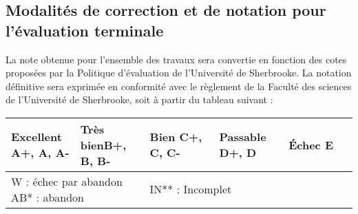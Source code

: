 \documentclass[12]{article}
\begin{document}
	\subsection*{Modalités de correction et de notation pour l'évaluation terminale}

	La note obtenue pour l’ensemble des travaux sera convertie en fonction des
	cotes proposées par la Politique d’évaluation de l’Université de Sherbrooke.
	La notation définitive sera exprimée en conformité avec le règlement de la
	Faculté des sciences de l’Université de Sherbrooke, soit à partir du tableau
	suivant :
	
	\begin{center}
		\begin{table}[h]
        \begin{tabular}{| p{0.2\linewidth} | p{0.2\linewidth} | p{0.2\linewidth} | p{0.2\linewidth} | p{0.2\linewidth} | } 
        \hline
        \textbf{Excellent} \linebreak A+, A, A- &
		\textbf{Très bien}\hfill\hfill \linebreak B+, B, B- & 
		\textbf{Bien} \linebreak C+, C, C- & 
		\textbf{Passable} \linebreak D+, D &
		\textbf{Échec} \linebreak E \\ [0.5ex] 
        \hline\hline
        \multicolumn{2}{l}{W : échec par abandon\hfill\hfill \linebreak
            AB* : abandon\hfill\hfill \linebreak} &
        \multicolumn{2}{l}{
            IN** : Incomplet\hfill\hfill \linebreak 
}
\end{tabular}
\end{table}
\end{center}
\end{document}

